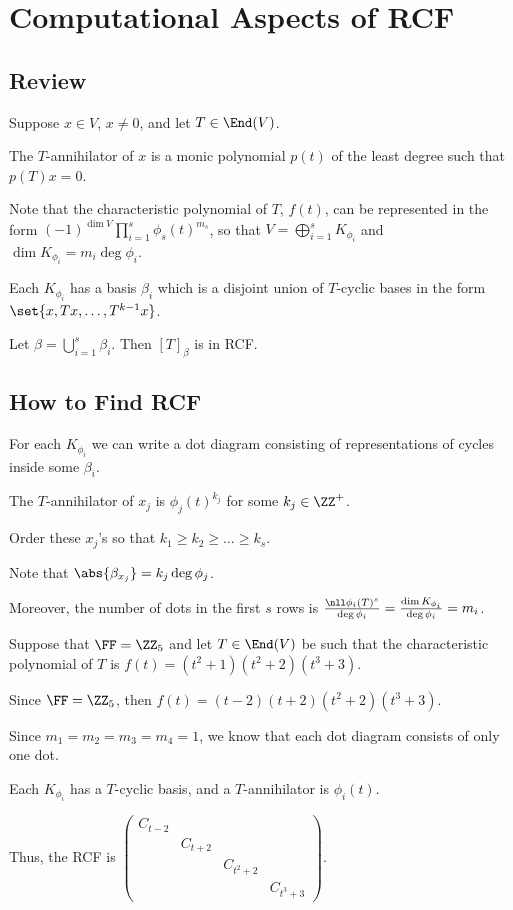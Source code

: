 \documentclass[11pt]{scrartcl}
\begin{document}
\section{Computational Aspects of RCF}

\subsection{Review}

Suppose $x\in V$, $x\neq 0$, and let $T \in \End(V)$.

The $T$-annihilator of $x$ is a monic polynomial $p(t)$ of the least
degree such that $p(T)x = 0$.


Note that the characteristic polynomial of $T$, $f(t)$, can be
represented in the form $(-1)^{\dim V}\prod_{i=1}^s\phi_s(t)^{m_s}$,
so that $V = \bigoplus_{i=1}^sK_{\phi_i}$ and
$\dim K_{\phi_i} = m_i\deg \phi_i$.

Each $K_{\phi_i}$ has a basis $\beta_i$ which is a disjoint union of
$T$-cyclic bases in the form $\set{x, Tx, \dots, T^{k-1}x}$.

Let $\beta = \bigcup_{i=1}^s \beta_i$. Then $[T]_{\beta}$ is in RCF.

\subsection{How to Find RCF}

For each $K_{\phi_i}$ we can write a dot diagram consisting of
representations of cycles inside some $\beta_i$.

The $T$-annihilator of $x_j$ is $\phi_j(t)^{k_j}$ for some $k_j\in\ZZ^+$.

Order these $x_j$'s so that $k_1\geq k_2\geq \dots \geq k_s$.

Note that $\abs{\beta_{x_j}}=k_j\deg \phi_j $.

Moreover, the number of dots in the first $s$ rows is
$\frac{\nll \phi_i(T)^s }{\deg \phi_i} = \frac{\dim K_{\phi_i}}{\deg
  \phi_i} = m_i$.

\begin{example}

  Suppose that $\FF = \ZZ_5$ and let $T \in \End(V)$ be such that the
  characteristic polynomial of $T$ is $f(t)= (t^2+1)(t^2+2)(t^3+3)$.

  Since $\FF = \ZZ_5$, then $f(t) = (t-2)(t+2)(t^2+2)(t^3+3)$.

  Since $m_1=m_2=m_3=m_4=1$, we know that each dot diagram consists of only one dot.

  Each $K_{\phi_i}$ has a $T$-cyclic basis, and a $T$-annihilator is
  $\phi_i(t)$. 

  Thus, the RCF is $
  \begin{pmatrix}
  C_{t-2}& & &\\
  & C_{t+2} & &\\
  & & C_{t^2+2} &\\
  & & & C_{t^3+3}
\end{pmatrix}
$.
\end{example}
\end{document}
